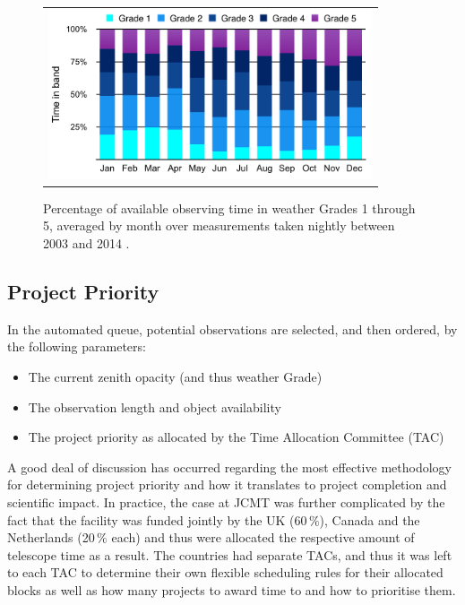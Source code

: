 \documentclass[]{spie}  %
\begin{document}
  \begin{figure}[h]
   \begin{center}
   \begin{tabular}{c}
   \includegraphics[height=5cm]{tauaverageperc}
   \end{tabular}
   \end{center}
   \caption{\label{fig:tau} Percentage of available observing time in weather Grades 1 through 5, averaged by month over measurements taken nightly between 2003 and 2014 .}
\end{figure}

\subsection{Project Priority}

In the automated queue, potential observations are selected, and then
ordered, by the following parameters:
\begin{itemize}
\item The current zenith opacity (and thus weather Grade)
\item The observation length and object availability
\item The project priority as allocated by the Time Allocation Committee (TAC)
\end{itemize}

A good deal of discussion has occurred regarding the most effective
methodology for determining project priority and how it translates to
project completion and scientific impact\cite{adamson2004,robson2002}.
In practice, the case at JCMT was further complicated by the fact that
the facility was funded jointly by the UK (60\,$\%$), Canada and the
Netherlands (20\,$\%$ each) and thus were allocated the respective
amount of telescope time as a result. The countries had separate TACs,
and thus it was left to each TAC to determine their own flexible
scheduling rules for their allocated blocks as well as how many
projects to award time to and how to prioritise them.
\end{document}
